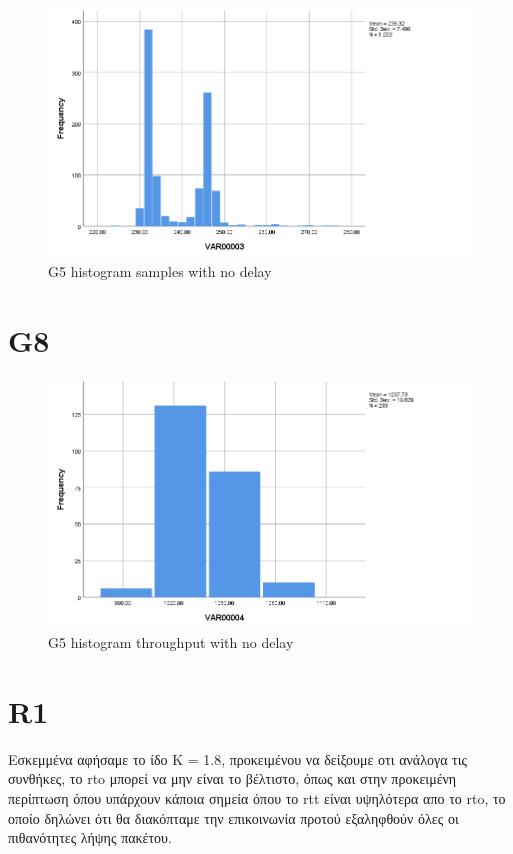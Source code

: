 \documentclass[hidelinks, 12pt, a4paper]{article}
\begin{document}
\begin{figure}[h!]
	\centering
		\includegraphics[height=.38\textheight, width=\textwidth]{assets/session2/g7.png}
		\caption{G5 histogram samples with no delay} 
	\end{figure}

\section{G8}

\begin{figure}[h!]
	\centering
		\includegraphics[height=.38\textheight, width=\textwidth]{assets/session2/g8.png}
		\caption{G5 histogram throughput with no delay} 
	\end{figure}

\section{R1}


Εσκεμμένα αφήσαμε το ίδο Κ = 1.8, προκειμένου να δείξουμε οτι ανάλογα τις συνθήκες, το rto μπορεί να μην είναι το βέλτιστο, όπως και στην προκειμένη περίπτωση όπου υπάρχουν κάποια σημεία όπου το rtt είναι υψηλότερα απο το rto, το οποίο δηλώνει ότι θα διακόπταμε την επικοινωνία προτού εξαληφθούν όλες οι πιθανότητες λήψης πακέτου.
\end{document}
